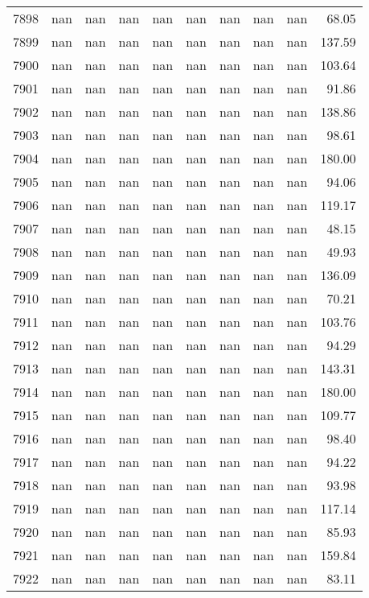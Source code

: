 \begin{tabular}{lrrrrrrrrr}
7898 & nan & nan & nan & nan & nan & nan & nan & nan & 68.05 \\
7899 & nan & nan & nan & nan & nan & nan & nan & nan & 137.59 \\
7900 & nan & nan & nan & nan & nan & nan & nan & nan & 103.64 \\
7901 & nan & nan & nan & nan & nan & nan & nan & nan & 91.86 \\
7902 & nan & nan & nan & nan & nan & nan & nan & nan & 138.86 \\
7903 & nan & nan & nan & nan & nan & nan & nan & nan & 98.61 \\
7904 & nan & nan & nan & nan & nan & nan & nan & nan & 180.00 \\
7905 & nan & nan & nan & nan & nan & nan & nan & nan & 94.06 \\
7906 & nan & nan & nan & nan & nan & nan & nan & nan & 119.17 \\
7907 & nan & nan & nan & nan & nan & nan & nan & nan & 48.15 \\
7908 & nan & nan & nan & nan & nan & nan & nan & nan & 49.93 \\
7909 & nan & nan & nan & nan & nan & nan & nan & nan & 136.09 \\
7910 & nan & nan & nan & nan & nan & nan & nan & nan & 70.21 \\
7911 & nan & nan & nan & nan & nan & nan & nan & nan & 103.76 \\
7912 & nan & nan & nan & nan & nan & nan & nan & nan & 94.29 \\
7913 & nan & nan & nan & nan & nan & nan & nan & nan & 143.31 \\
7914 & nan & nan & nan & nan & nan & nan & nan & nan & 180.00 \\
7915 & nan & nan & nan & nan & nan & nan & nan & nan & 109.77 \\
7916 & nan & nan & nan & nan & nan & nan & nan & nan & 98.40 \\
7917 & nan & nan & nan & nan & nan & nan & nan & nan & 94.22 \\
7918 & nan & nan & nan & nan & nan & nan & nan & nan & 93.98 \\
7919 & nan & nan & nan & nan & nan & nan & nan & nan & 117.14 \\
7920 & nan & nan & nan & nan & nan & nan & nan & nan & 85.93 \\
7921 & nan & nan & nan & nan & nan & nan & nan & nan & 159.84 \\
7922 & nan & nan & nan & nan & nan & nan & nan & nan & 83.11 \\

\end{tabular}
